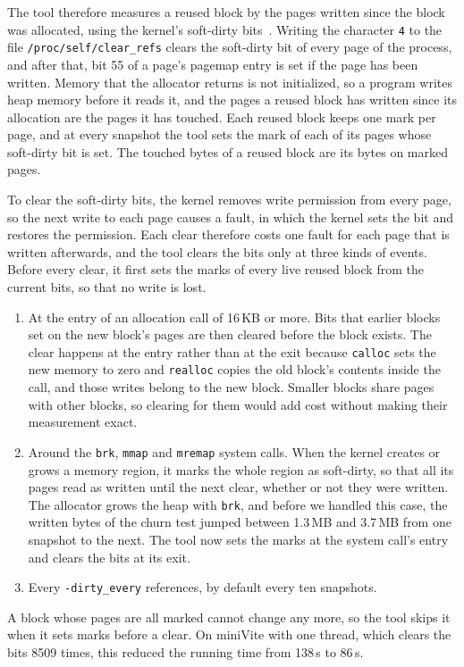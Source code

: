 \documentclass[11pt]{article}
\newcommand{\knob}[1]{\texttt{-#1}}
\begin{document}
The tool therefore measures a reused block by the pages written since the block was allocated, using the kernel's soft-dirty bits~\cite{softdirty}. Writing the character \texttt{4} to the file \texttt{/proc/self/clear\_refs} clears the soft-dirty bit of every page of the process, and after that, bit 55 of a page's pagemap entry is set if the page has been written. Memory that the allocator returns is not initialized, so a program writes heap memory before it reads it, and the pages a reused block has written since its allocation are the pages it has touched. Each reused block keeps one mark per page, and at every snapshot the tool sets the mark of each of its pages whose soft-dirty bit is set. The touched bytes of a reused block are its bytes on marked pages.

To clear the soft-dirty bits, the kernel removes write permission from every page, so the next write to each page causes a fault, in which the kernel sets the bit and restores the permission. Each clear therefore costs one fault for each page that is written afterwards, and the tool clears the bits only at three kinds of events. Before every clear, it first sets the marks of every live reused block from the current bits, so that no write is lost.
\begin{enumerate}
\item At the entry of an allocation call of 16\,KB or more. Bits that earlier blocks set on the new block's pages are then cleared before the block exists. The clear happens at the entry rather than at the exit because \texttt{calloc} sets the new memory to zero and \texttt{realloc} copies the old block's contents inside the call, and those writes belong to the new block. Smaller blocks share pages with other blocks, so clearing for them would add cost without making their measurement exact.
\item Around the \texttt{brk}, \texttt{mmap} and \texttt{mremap} system calls. When the kernel creates or grows a memory region, it marks the whole region as soft-dirty, so that all its pages read as written until the next clear, whether or not they were written. The allocator grows the heap with \texttt{brk}, and before we handled this case, the written bytes of the churn test jumped between 1.3\,MB and 3.7\,MB from one snapshot to the next. The tool now sets the marks at the system call's entry and clears the bits at its exit.
\item Every \knob{dirty\_every} references, by default every ten snapshots.
\end{enumerate}
A block whose pages are all marked cannot change any more, so the tool skips it when it sets marks before a clear. On miniVite with one thread, which clears the bits 8509 times, this reduced the running time from 138\,s to 86\,s.
\end{document}
